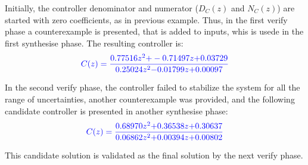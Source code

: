 \documentclass{sig-alternate-05-2015}
\newcommand{\blue}[1]{{\color{blue}#1}}
\begin{document}
\blue{Initially, the controller denominator and numerator  ($D_{C}(z)$ and $N_{C}(z)$) are started with zero coefficients, as in previous example. Thus,  in the first {\sc verify} phase a counterexample is presented, that is added to {\sc inputs}, whis is usede in the first  {\sc synthesise} phase. The resulting controller is:
}
$$
{
\blue{
C(z)=\frac{0.77516z^2{+}-0.71497z{+}0.03729}{0.25024z^2{-}0.01799z{+}0.00097}
}}
$$

\blue{In the second {\sc verify} phase, the controller failed to stabilize the system for all the range of uncertainties, another counterexample was provided, and the following candidate controller is presented in another {\sc synthesise} phase:}
$$
{
\blue{
C(z)=\frac{0.68970z^2{+}0.36538z{+}0.30637}{0.06862z^2{+}0.00394z{+}0.00802}
}}
$$

\blue{
This candidate solution is validated as the final solution by the next 
{\sc verify} phase.
}



\end{document}
